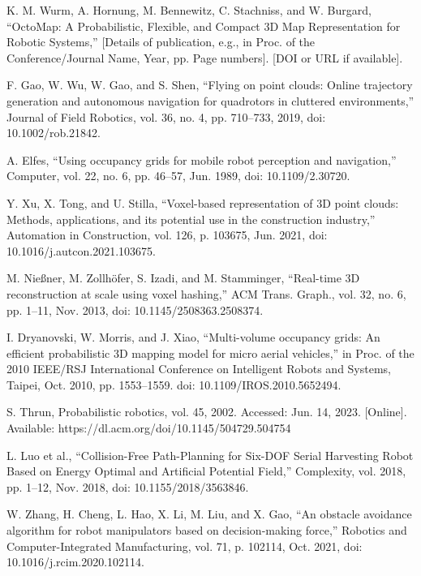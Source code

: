 \documentclass[letterpaper, 10 pt, conference]{ieeeconf}  %
\begin{document}
\begin{thebibliography}{99}
 K. M. Wurm, A. Hornung, M. Bennewitz, C. Stachniss, and W. Burgard, “OctoMap: A Probabilistic, Flexible, and Compact 3D Map Representation for Robotic Systems,” [Details of publication, e.g., in Proc. of the Conference/Journal Name, Year, pp. Page numbers]. [DOI or URL if available].

 F. Gao, W. Wu, W. Gao, and S. Shen, “Flying on point clouds: Online trajectory generation and autonomous navigation for quadrotors in cluttered environments,” Journal of Field Robotics, vol. 36, no. 4, pp. 710–733, 2019, doi: 10.1002/rob.21842.

 A. Elfes, “Using occupancy grids for mobile robot perception and navigation,” Computer, vol. 22, no. 6, pp. 46–57, Jun. 1989, doi: 10.1109/2.30720.



 Y. Xu, X. Tong, and U. Stilla, “Voxel-based representation of 3D point clouds: Methods, applications, and its potential use in the construction industry,” Automation in Construction, vol. 126, p. 103675, Jun. 2021, doi: 10.1016/j.autcon.2021.103675.

 M. Nießner, M. Zollhöfer, S. Izadi, and M. Stamminger, “Real-time 3D reconstruction at scale using voxel hashing,” ACM Trans. Graph., vol. 32, no. 6, pp. 1–11, Nov. 2013, doi: 10.1145/2508363.2508374.

 I. Dryanovski, W. Morris, and J. Xiao, “Multi-volume occupancy grids: An efficient probabilistic 3D mapping model for micro aerial vehicles,” in Proc. of the 2010 IEEE/RSJ International Conference on Intelligent Robots and Systems, Taipei, Oct. 2010, pp. 1553–1559. doi: 10.1109/IROS.2010.5652494.

 S. Thrun, Probabilistic robotics, vol. 45, 2002. Accessed: Jun. 14, 2023. [Online]. Available: https://dl.acm.org/doi/10.1145/504729.504754



 L. Luo et al., “Collision-Free Path-Planning for Six-DOF Serial Harvesting Robot Based on Energy Optimal and Artificial Potential Field,” Complexity, vol. 2018, pp. 1–12, Nov. 2018, doi: 10.1155/2018/3563846.

 W. Zhang, H. Cheng, L. Hao, X. Li, M. Liu, and X. Gao, “An obstacle avoidance algorithm for robot manipulators based on decision-making force,” Robotics and Computer-Integrated Manufacturing, vol. 71, p. 102114, Oct. 2021, doi: 10.1016/j.rcim.2020.102114.




\end{thebibliography}
\end{document}
